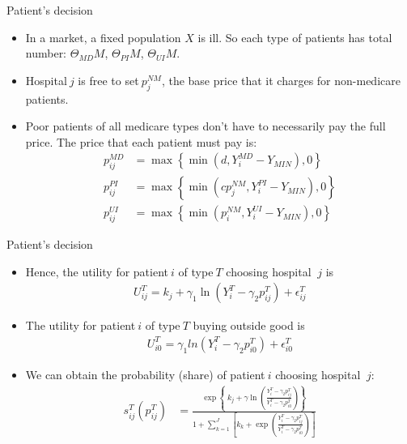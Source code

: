 \documentclass[aspectratio=169]{beamer}  %
\begin{document}
\begin{frame}{Patient's decision}
    \begin{itemize}
        \item  In a market, a fixed population $X$ is ill. So each type of patients has total number: $\Theta_{MD}M$, $\Theta_{PI}M$, $\Theta_{UI}M$. 
        \item Hospital$\ j$ is free to set$\ p_j^{NM}$, the base price that it charges for non-medicare patients.
        \item Poor patients of all medicare types don't have to necessarily pay the full price. The price that each patient must pay is:
        \begin{align*}
        p_{ij}^{MD} &= \max\left\{\min\left(d, Y_{i}^{MD}- Y_{MIN}\right), 0\right\} \\
        p_{ij}^{PI} &= \max\left\{\min\left(cp_{j}^{NM}, Y_{i}^{PI} - Y_{MIN}\right), 0\right\} \\
        p_{ij}^{UI} &= \max\left\{\min\left(p_{i}^{NM}, Y_{i}^{UI} - Y_{MIN}\right), 0\right\}
        \end{align*}
        
    \end{itemize}

\end{frame}

\begin{frame}{Patient's decision}
    \begin{itemize}
        \item  Hence, the utility for patient$\ i$ of type$
        \ T$ choosing hospital $\ j$ is
        \begin{align*}
        U_{ij}^{T} = k_j + \gamma_1 \ln (Y_i^T-\gamma_2 p_{ij}^T)+ \epsilon_{ij}^T  
        \end{align*}
        \item  The utility for patient$\ i$ of type$
        \ T$ buying outside good is
        \begin{align*}
        U_{i0}^{T} = \gamma_1 ln (Y_i^T-\gamma_2 p_{i0}^T)+ \epsilon_{i0}^T  
        \end{align*}
        \item We can obtain the probability (share) of patient$\ i$ choosing hospital $\ j$:
        \begin{align*}
         s_{ij}^{T}(p_{ij}^{T}) &= \frac{\exp\left\{\ k_j + \gamma \ln (\frac{Y_i^T-\gamma_2 p_{ij}^T}{Y_i^T-\gamma_2 p_{i0}^T})\right\}}{1+\sum_{k=1}^J [k_k+\exp(\frac{Y_i^T-\gamma_2 p_{ij}^T}{Y_i^T-\gamma_2 p_{i0}^T})]}
        \end{align*}
    
        
    \end{itemize}

\end{frame}
\end{document}
